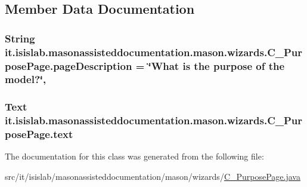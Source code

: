 \subsection{Member Data Documentation}
\hypertarget{classit_1_1isislab_1_1masonassisteddocumentation_1_1mason_1_1wizards_1_1_c___purpose_page_a62e6e8e416e6c87fd490db86b8085533}{
\subsubsection[{page\-Description}]{\setlength{\rightskip}{0pt plus 5cm}String it.\-isislab.\-masonassisteddocumentation.\-mason.\-wizards.\-C\-\_\-\-Purpose\-Page.\-page\-Description = \char`\"{}What is the purpose of the model?\char`\"{}\hspace{0.3cm}{\ttfamily [static]}, {\ttfamily [private]}}}\label{classit_1_1isislab_1_1masonassisteddocumentation_1_1mason_1_1wizards_1_1_c___purpose_page_a62e6e8e416e6c87fd490db86b8085533}
\hypertarget{classit_1_1isislab_1_1masonassisteddocumentation_1_1mason_1_1wizards_1_1_c___purpose_page_ac7b1a3918766a267a7594f729ea7faac}{
\subsubsection[{text}]{\setlength{\rightskip}{0pt plus 5cm}Text it.\-isislab.\-masonassisteddocumentation.\-mason.\-wizards.\-C\-\_\-\-Purpose\-Page.\-text\hspace{0.3cm}{\ttfamily [private]}}}\label{classit_1_1isislab_1_1masonassisteddocumentation_1_1mason_1_1wizards_1_1_c___purpose_page_ac7b1a3918766a267a7594f729ea7faac}


The documentation for this class was generated from the following file\-:\begin{DoxyCompactItemize}
\item 
src/it/isislab/masonassisteddocumentation/mason/wizards/\hyperlink{_c___purpose_page_8java}{C\-\_\-\-Purpose\-Page.\-java}\end{DoxyCompactItemize}
